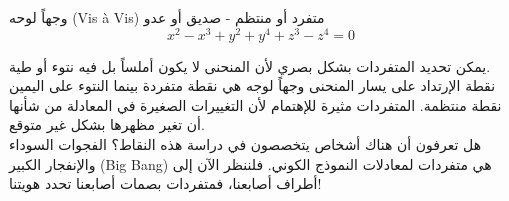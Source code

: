 \begin{surferPage}{وجهاً لوحه \textenglish{(Vis à Vis)}}
متفرد أو منتظم - صديق أو عدو\\
\smallskip
\[x^2	- x^3+ y^2+ y^4+ z^3- z^4	=  0\]

\vspace{0.3cm}
يمكن تحديد المتفردات بشكل بصري لأن المنحنى لا يكون أملساً بل فيه نتوء أو طية.\\
\vspace{0.3cm}
نقطة الإرتداد على يسار المنحنى وجهاً لوجه هي نقطة متفردة بينما النتوء على اليمين نقطة منتظمة. المتفردات مثيرة للإهتمام لأن التغييرات الصغيرة في المعادلة من شأنها أن تغير مظهرها بشكل غير متوقع. \\ 

\vspace{0.3cm}
هل تعرفون أن هناك أشخاص يتخصصون في دراسة هذه النقاط؟ الفجوات السوداء والإنفجار الكبير
 \textenglish{(Big Bang)}
  هي متفردات لمعادلات النموذج الكوني. فلننظر الآن إلى أطراف أصابعنا، فمتفردات بصمات أصابعنا تحدد هويتنا!
\end{surferPage}
